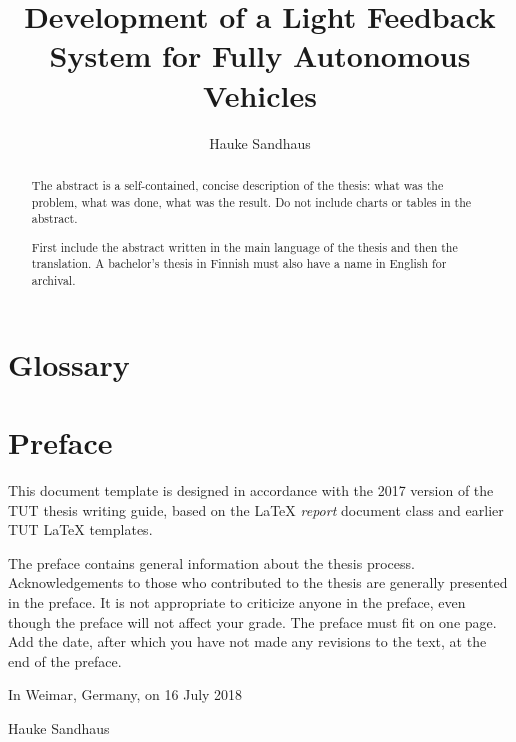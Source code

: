 \documentclass[twoside]{tutthesis} %
\author{Hauke Sandhaus}
\title{Development of a Light Feedback System for Fully Autonomous Vehicles}
\begin{document}
\maketitle



\begin{abstract}
The abstract is a self-contained, concise description of the thesis: what was the problem, what was done, what was the result.
Do not include charts or tables in the abstract.

First include the abstract written in the main language of the thesis and then the translation.
A bachelor's thesis in Finnish must also have a name in English for archival.
\end{abstract}


\chapter{Glossary}
\label{ch:glossary}


\chapter*{Preface}
\label{ch:preface}
This document template is designed in accordance with the 2017 version of the TUT thesis writing guide, based on the LaTeX \emph{report} document class and earlier TUT LaTeX templates.

The preface contains general information about the thesis process.
Acknowledgements to those who contributed to the thesis are generally presented in the preface.
It is not appropriate to criticize anyone in the preface, even though the preface will not affect your grade.
The preface must fit on one page.
Add the date, after which you have not made any revisions to the text, at the end of the preface.

\vspace{2\baselineskip}

In Weimar, Germany, on 16 July 2018

\vspace{2\baselineskip}

Hauke Sandhaus



\tableofcontents
\end{document}
